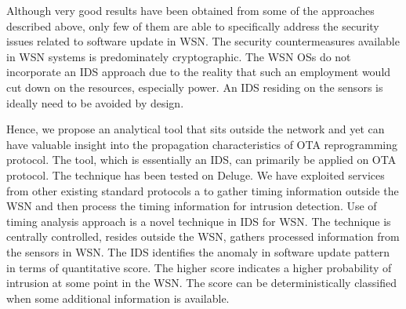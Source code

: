 \documentclass[conference,manuscript]{IEEEtran}
\begin{document}
Although very good results have been obtained from some of the approaches described above, only few of them are able to specifically address the security issues related to software update in WSN.
The security countermeasures available in WSN systems is predominately cryptographic.
The WSN OSs do not incorporate an IDS approach due to the reality that such an employment would cut down on the resources, especially power.
An IDS residing on the sensors is ideally need to be avoided by design.

Hence, we propose an analytical tool that sits outside the network and yet can have valuable insight into the propagation characteristics of OTA reprogramming protocol. 
The tool, which is essentially an IDS, can primarily be applied on OTA protocol.
The technique has been tested on Deluge.
We have exploited services from other existing standard protocols a to gather timing information outside the WSN and then process the timing information for intrusion detection.
Use of timing analysis approach is a novel technique in IDS for WSN.
The technique is centrally controlled, resides outside the WSN, gathers processed information from the sensors in WSN.
The IDS identifies the anomaly in software update pattern in terms of quantitative score. The higher score indicates a higher probability of intrusion at some point in the WSN. The score can be deterministically classified when some additional information is available.
\end{document}
